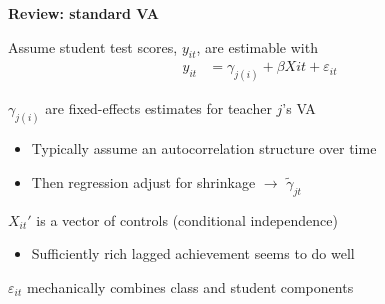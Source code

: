 \documentclass[t,aspectratio=169,11pt,presentation]{beamer}
\newenvironment{wideitemize}{\itemize\addtolength{\itemsep}{14pt}}{\enditemize}
\begin{document}
\begin{frame}{\textbf{Review: standard VA}}
    \begin{wideitemize}
    \item Assume student test scores, $y_{it}$, are estimable with
    \begin{align*}
        y_{it} &= \gamma_{j(i)} + \beta X{it} +  \varepsilon_{it}
    \end{align*}
    \item $\gamma_{j(i)}$ are fixed-effects estimates for teacher $j$'s VA 
    \begin{itemize}
        \item Typically assume an autocorrelation structure over time
        \item Then regression adjust for shrinkage $\to$ $\tilde{\gamma}_{jt}$
    \end{itemize}
    \item $X_{it}'$ is a vector of controls (conditional independence)
        \begin{itemize}
            \item Sufficiently rich lagged achievement seems to do well \citep{chetty2014measuring1}
        \end{itemize}
    \item $\varepsilon_{it}$ mechanically combines class and student components
    \end{wideitemize}
    
\end{frame}
\end{document}
